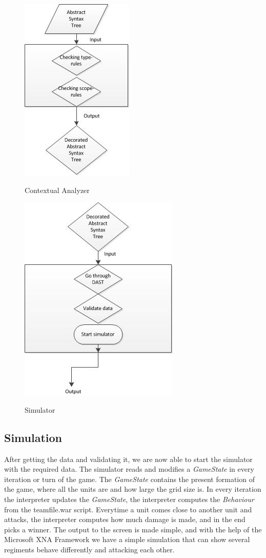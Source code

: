 \begin{figure}[H]
\centering
\includegraphics[scale=1]{rapport/6/figures/contextual_analyzer}
\label{fig:contextual_analyzer}
\caption{Contextual Analyzer}
\end{figure}

\begin{figure}[H]
\centering
\includegraphics[scale=1]{rapport/6/figures/simulator}
\label{fig:simulator}
\caption{Simulator}
\end{figure}


\subsection{Simulation}

After getting the data and validating it, we are now able to start the simulator with the required data. 
The simulator reads and modifies a \textit{GameState} in every iteration or turn of the game. The \textit{GameState} contains the present formation of the game, where all the units are and how large the grid size is. In every iteration the interpreter updates the \textit{GameState}, the interpreter computes the \textit{Behaviour} from the teamfile.war script. Everytime a unit comes close to another unit and attacks, the interpreter computes how much damage is made, and in the end picks a winner. The output to the screen is made simple, and with the help of the Microsoft XNA \cite{XNA} Framework we have a simple simulation that can show several regiments behave differently and attacking each other.


